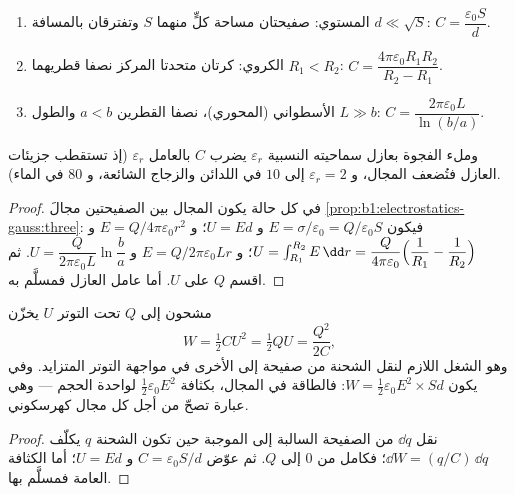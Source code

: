 \begin{proposition}\label{prop:b1:potential-capacitors:three}
\begin{enumerate}
  \item المستوي: صفيحتان مساحة كلٍّ منهما $S$ وتفترقان بالمسافة $d \ll \sqrt S$:
        $C = \dfrac{\varepsilon_0S}{d}$.
  \item الكروي: كرتان متحدتا المركز نصفا قطريهما $R_1 < R_2$:
        $C = \dfrac{4\pi\varepsilon_0R_1R_2}{R_2 - R_1}$.
  \item الأسطواني (المحوري)، نصفا القطرين $a < b$ والطول $L \gg b$:
        $C = \dfrac{2\pi\varepsilon_0L}{\ln(b/a)}$.
\end{enumerate}
وملء الفجوة بعازل سماحيته النسبية
$\varepsilon_r$ يضرب $C$ بالعامل $\varepsilon_r$ (إذ تستقطب جزيئات العازل
فتُضعف المجال، و $\varepsilon_r = 2$ إلى $10$ في اللدائن
والزجاج الشائعة، و $80$ في الماء).
\end{proposition}

\begin{proof}
في كل حالة يكون المجال بين الصفيحتين مجالَ
\cref{prop:b1:electrostatics-gauss:three}: فيكون $E = \sigma/\varepsilon_0 = Q/\varepsilon_0S$
و $U = Ed$؛ و $E = Q/4\pi\varepsilon_0r^2$ و $U = \int_{R_1}^{R_2}E\,\dd r = \dfrac{Q}{4\pi\varepsilon_0}
\Bigl(\dfrac1{R_1} - \dfrac1{R_2}\Bigr)$؛ و $E = Q/2\pi\varepsilon_0Lr$ و $U =
\dfrac{Q}{2\pi\varepsilon_0L}\ln\dfrac ba$. ثم اقسم $Q$ على $U$. أما عامل العازل
فمسلَّم به.
\end{proof}

\begin{theorem}\label{thm:b1:potential-capacitors:energy}
 مشحون إلى $Q$ تحت التوتر $U$ يخزّن
\[
W = \tfrac12 CU^2 = \tfrac12 QU = \frac{Q^2}{2C} ,
\]
وهو الشغل اللازم لنقل الشحنة من صفيحة إلى الأخرى
في مواجهة التوتر المتزايد. وفي  يكون $W = \tfrac12\varepsilon_0E^2
\times Sd$: فالطاقة في المجال، بكثافة $\tfrac12\varepsilon_0E^2$
لواحدة الحجم --- وهي عبارة تصحّ من أجل كل مجال
كهرسكوني.
\end{theorem}

\begin{proof}
نقل $\dd q$ من الصفيحة السالبة إلى الموجبة حين تكون الشحنة
$q$ يكلّف $\dd W = (q/C)\,\dd q$؛ فكامل من $0$ إلى $Q$. ثم
عوّض $C = \varepsilon_0S/d$ و $U = Ed$؛ أما الكثافة العامة فمسلَّم بها.
\end{proof}

